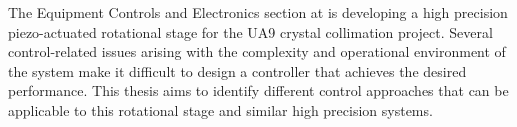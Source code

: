 The Equipment Controls and Electronics section at \abbrCERN is developing a high precision piezo-actuated rotational stage for the UA9 crystal collimation project. Several control-related issues arising with the complexity and operational environment of the system make it difficult to design a controller that achieves the desired performance. This thesis aims to identify different control approaches that can be applicable to this rotational stage and similar high precision systems.

